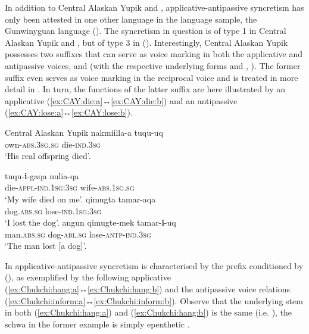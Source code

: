 In addition to Central Alaskan Yupik and , applicative-antipassive syncretism has only been attested in one other language in the language sample, the Gunwinyguan language  (). The syncretism in question is of type 1 in Central Alaskan Yupik and , but of type 3 in  (). Interestingly, Central Alaskan Yupik possesses two suffixes that can serve as voice marking in both the applicative and antipassive voices,  and  (with the respective underlying forms  and , \citealt[830ff.]{miyaoka:2012}). The former suffix even serves as voice marking in the reciprocal voice and is treated in more detail in . In turn, the functions of the latter suffix are here illustrated by an applicative  (\ref{ex:CAY:die:a}↔\ref{ex:CAY:die:b}) and an antipassive  (\ref{ex:CAY:lose:a}↔\ref{ex:CAY:lose:b}).

\ea Central Alaskan Yupik \citep[396, 517, 836]{miyaoka:2012}
\ea\label{ex:CAY:die:a}
	\gll	nakmiilla-a tuqu-uq \\
			own-\textsc{abs.3sg.sg} die-\textsc{ind.3sg} \\
	\glt	‘His real offspring died’.

\ex\label{ex:CAY:die:b}
	\gll	tuqu-\textbf{i}-gaqa nulia-qa \\
			die-\textsc{appl-ind.1sg:3sg} wife-\textsc{abs.1sg.sg} \\
	\glt	‘My wife died on me’.
\ex\label{ex:CAY:lose:a}
	\gll	qimugta tamar-aqa \\
			dog.\textsc{abs.sg} lose-\textsc{ind.1sg:3sg} \\
	\glt	‘I lost the dog’.
\ex\label{ex:CAY:lose:b}
	\gll	angun {\ob}qimugte-mek{\cb} tamar-\textbf{i}-uq \\
			man.\textsc{abs.sg} {\db}dog-\textsc{abl.sg} lose-\textsc{antp-ind.3sg} \\
	\glt	‘The man lost [a dog]’.
	\z 
\z

In  applicative-antipassive syncretism is characterised by the prefix  conditioned by  (\citealt[48]{dunn:1999}), as exemplified by the following applicative (\ref{ex:Chukchi:hang:a}↔\ref{ex:Chukchi:hang:b}) and the antipassive voice relations (\ref{ex:Chukchi:inform:a}↔\ref{ex:Chukchi:inform:b}). Observe that the underlying stem in both (\ref{ex:Chukchi:hang:a}) and (\ref{ex:Chukchi:hang:b}) is the same (i.e. ), the schwa in the former example is simply epenthetic \citep[39ff.]{dunn:1999}. 

